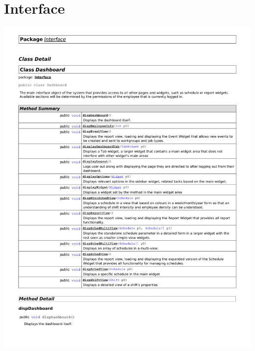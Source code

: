 \documentclass[letterpaper,12pt]{report}
\begin{document}
\section{Interface}
\includegraphics[scale=0.9,trim=10mm 30mm 25mm 35mm]{externals/di1.pdf}
\newpage
\end{document}
